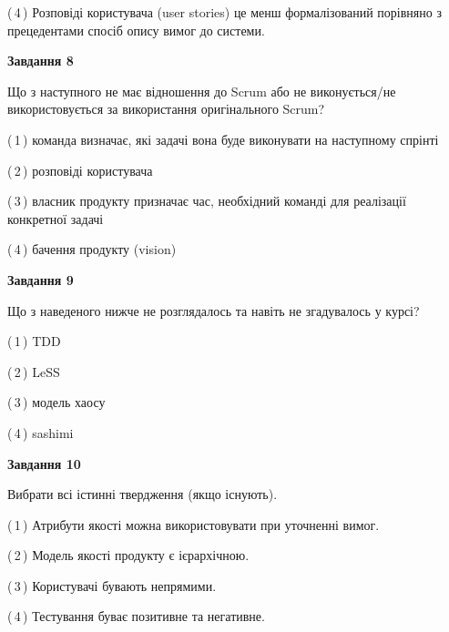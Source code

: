 \documentclass[10pt, ukrainian]{article}
\begin{document}
{\begin {large}
(\,4\,) Розповіді користувача (user stories) це менш формалізований порівняно з прецедентами спосіб опису вимог до системи. %


{\begin {center}\textbf{Завдання 8}\end {center}}\par
Що з наступного не має відношення до Scrum або не виконується/не використовується за використання оригінального Scrum?\par
\vspace{2mm}



(\,1\,) команда визначає, які задачі вона буде виконувати на наступному спрінті%



(\,2\,) розповіді користувача%



(\,3\,) власник продукту призначає час, необхідний команді для реалізації конкретної задачі%



(\,4\,) бачення продукту (vision) %


{\begin {center}\textbf{Завдання 9}\end {center}}\par
Що з наведеного нижче не розглядалось та навіть не згадувалось у курсі?\par
\vspace{2mm}



(\,1\,) TDD%



(\,2\,) LeSS%



(\,3\,) модель хаосу%



(\,4\,) sashimi%


{\begin {center}\textbf{Завдання 10}\end {center}}\par
Вибрати всі істинні твердження (якщо існують).\par
\vspace{2mm}



(\,1\,) Атрибути якості можна використовувати при уточненні вимог.%



(\,2\,) Модель якості продукту є ієрархічною.%



(\,3\,) Користувачі бувають непрямими.%



(\,4\,) Тестування буває позитивне та негативне.%



\end {large}}
\end{document}
